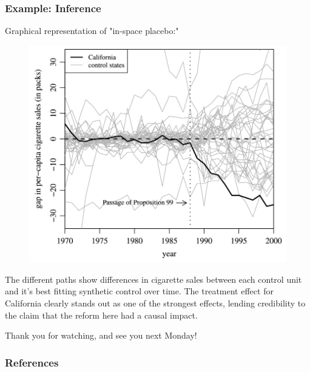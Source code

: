 \documentclass[12pt,english,dvipsnames,aspectratio=169,handout]{beamer}\usepackage[]{graphicx}\usepackage[]{xcolor}
\begin{document}
\begin{frame}
  \frametitle{Example: Inference}
\footnotesize

Graphical representation of "in-space placebo:"

	 \begin{figure} 
    \includegraphics[height=.55\textheight,keepaspectratio=true]{../04-figures/08/09-abadie3}
    \end{figure}
\scriptsize
The different paths show differences in cigarette sales between each control unit and it's best fitting synthetic control over time. The treatment effect for California clearly stands out as one of the strongest effects, lending credibility to the claim that the reform here had a causal impact.
\end{frame}


\begin{frame}
\begin{center}
    \LARGE Thank you for watching, and see you next Monday!
\end{center}
\end{frame}


\begin{frame}[allowframebreaks]
\frametitle{References}

\scriptsize
\end{frame}
\end{document}
